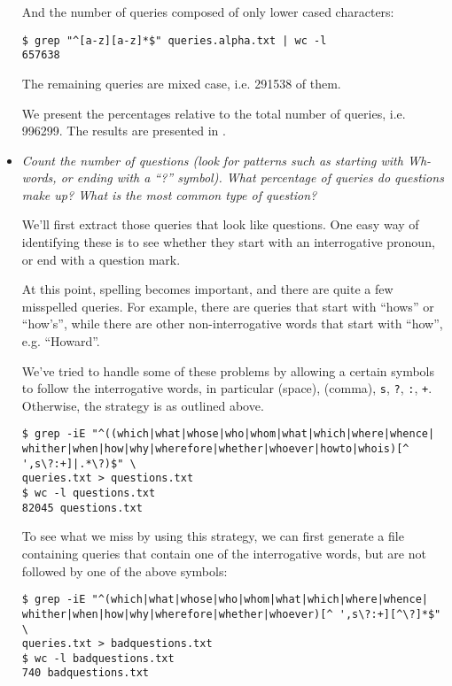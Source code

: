 \begin{itemize}
And the number of queries composed of only lower cased characters:

\begin{lstlisting}
$ grep "^[a-z][a-z]*$" queries.alpha.txt | wc -l
657638
\end{lstlisting}

The remaining queries are mixed case, i.e. 291538 of them.

We present the percentages relative to the total number of queries, i.e.
996299. The results are presented in .

\item \emph{Count the number of questions (look for patterns such as starting
with Wh-words, or ending with a ``?''    symbol). What percentage of queries do
questions make up? What is the most common type of question?}

We'll first extract those queries that look like questions. One easy way of
identifying these is to see whether they start with an interrogative pronoun,
or end with a question mark.

At this point, spelling becomes important, and there are quite a few misspelled
queries. For example, there are queries that start with ``hows'' or ``how's'',
while there are other non-interrogative words that start with ``how'', e.g.
``Howard''.

We've tried to handle some of these problems by allowing a certain symbols to
follow the interrogative words, in particular (space), (comma), \texttt{s},
\texttt{?}, \texttt{:}, \texttt{+}. Otherwise, the strategy is as outlined
above.

\begin{lstlisting}
$ grep -iE "^((which|what|whose|who|whom|what|which|where|whence|
whither|when|how|why|wherefore|whether|whoever|howto|whois)[^ ',s\?:+]|.*\?)$" \
queries.txt > questions.txt
$ wc -l questions.txt 
82045 questions.txt
\end{lstlisting}

To see what we miss by using this strategy, we can first generate a file
containing queries that contain one of the interrogative words, but are not
followed by one of the above symbols:

\begin{lstlisting}
$ grep -iE "^(which|what|whose|who|whom|what|which|where|whence|
whither|when|how|why|wherefore|whether|whoever)[^ ',s\?:+][^\?]*$" \
queries.txt > badquestions.txt
$ wc -l badquestions.txt 
740 badquestions.txt
\end{lstlisting}


\end{itemize}
